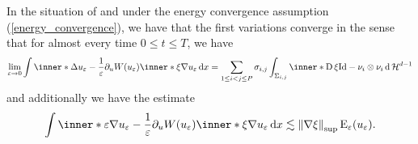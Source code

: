 \begin{proposition}
	\label{convergence_of_curvature_multiphase}
	In the situation of  and under the energy convergence assumption (\ref{energy_convergence}), we have that the first variations converge in the sense that for almost every time $ 0 \leq t \leq T $, we have
	\begin{equation*}
		\lim_{ \varepsilon \to 0 }
			\int
				\inner*{ 
					\Delta u_{ \varepsilon } - \frac{ 1 }{ \varepsilon } \partial_{ u } W ( u_{ \varepsilon } ) 
				}
				{ \inner*{ \xi }{ \nabla u_{ \varepsilon } } }
			\dd{ x }
		=
		\sum_{ 1 \leq i < j \leq P }
			\sigma_{ i , j }
			\int_{ \Sigma_{ i , j } }
				\inner*{ \diff \xi }{ \mathrm{Id} - \nu_{ i } \otimes \nu_{ i } }
			\dd{ \hm^{ d - 1} }
	\end{equation*}
	and additionally we have the estimate
	\begin{equation}
		\label{pointwise_estimate_for_curvature}
		\int
		\inner*{ 
			\varepsilon \nabla u_{ \varepsilon } - \frac{ 1 }{ \varepsilon } 	\partial_{ u } W ( u_{ \varepsilon } ) 
		}
		{ \inner*{ \xi }{ \nabla u_{ \varepsilon } } }
		\dd{ x }
		\lesssim
		\norm{ \nabla \xi }_{ \sup }
		\energy_{ \varepsilon } ( u_{ \varepsilon } ).
	\end{equation}
\end{proposition}

